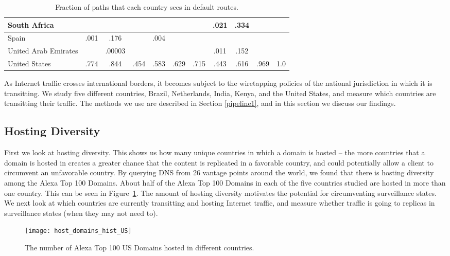\begin{table*}[t]
\begin{tabular}{|P{37mm}|cc|cc|cc|cc|cc|}
South Africa             &    &   &     &  &   &   &.021    &.334     &  & \\\hline
Spain             &.001     &.176   &    &.004  &   &   &   &     &  & \\\hline
United Arab Emirates             &     &.00003   &     &  &   &   &.011    &.152     &  & \\\hline
United States             &.774     &.844   &.454     &.583  &.629    &.715   &.443    &.616     &.969  &1.0 \\\hline
\end{tabular}
\caption{Fraction of paths that each country sees in default routes.}
\label{tab:transit_host}
\end{table*}

As Internet traffic crosses international borders, it becomes subject to the wiretapping policies of the national jurisdiction in which it is transitting.  We study five different countries, Brazil, Netherlands, India, Kenya, and the United States, and measure which countries are transitting their traffic.  The methods we use are described in Section \ref{pipeline1}, and in this section we discuss our findings.

\subsection{Hosting Diversity}
First we look at hosting diversity.  This shows us how many unique countries in which a domain is hosted -- the more countries that a domain is hosted in creates a greater chance that the content is replicated in a favorable country, and could potentially allow a client to circumvent an unfavorable country.  By querying DNS from 26 vantage points around the world, we found that there is hosting diversity among the Alexa Top 100 Domains.  About half of the Alexa Top 100 Domains in each of the five countries studied are hosted in more than one country.  This can be seen in Figure~\ref{fig:host_diversity}.  The amount of hosting diversity motivates the potential for circumventing surveillance states.  We next look at which countries are currently transitting and hosting Internet traffic, and measure whether traffic is going to replicas in surveillance states (when they may not need to).

\begin{figure}
\centering
\texttt{[image: host\_domains\_hist\_US]}
\caption{The number of Alexa Top 100 US Domains hosted in different countries.}
\label{fig:host_diversity}
\end{figure}

